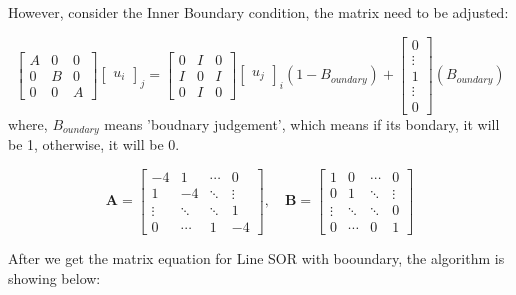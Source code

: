 \documentclass[12pt]{article}
\begin{document}
However, consider the Inner Boundary condition, the matrix need to be adjusted:

\[
\begin{bmatrix}
A & 0 & 0 \\
0 & B & 0 \\
0 & 0 & A
\end{bmatrix}
\begin{bmatrix}
u_{i}
\end{bmatrix}_j
=
\begin{bmatrix}
    0 & I & 0 \\
    I & 0 & I \\
    0 & I & 0
    \end{bmatrix}
\begin{bmatrix}
u_j
\end{bmatrix}_i
(1 - B_{oundary}) + 
\begin{bmatrix}
0
\\
\vdots\\
1\\
\vdots\\
0


\end{bmatrix}
(B_{oundary})
\]
where, $B_{oundary}$ means 'boudnary judgement', which means if its bondary, it will
be 1, otherwise, it will be 0.


\[
\mathbf{A} = 
\begin{bmatrix}
-4 & 1 & \cdots & 0 \\
1 & -4 & \ddots &  \vdots\\
\vdots & \ddots & \ddots & 1 \\
0 & \cdots & 1 & -4
\end{bmatrix}, \quad
\mathbf{B} = 
\begin{bmatrix}
1 & 0 & \cdots & 0 \\
0 & 1 & \ddots & \vdots \\
\vdots & \ddots & \ddots & 0 \\
0 & \cdots & 0 & 1
\end{bmatrix}
\]

After we get the matrix equation for Line SOR with booundary, the algorithm is showing
below:\\
\end{document}
